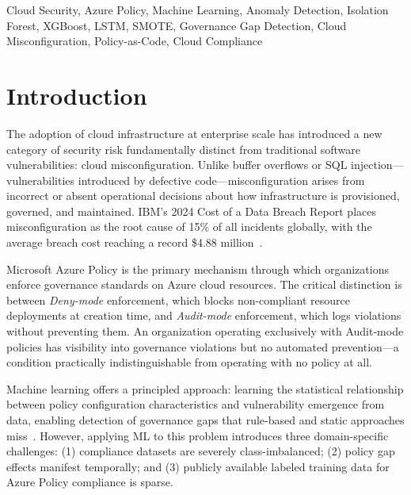 \documentclass[conference]{IEEEtran}
\begin{document}
\begin{IEEEkeywords}
Cloud Security, Azure Policy, Machine Learning, Anomaly Detection, 
Isolation Forest, XGBoost, LSTM, SMOTE, Governance Gap Detection, 
Cloud Misconfiguration, Policy-as-Code, Cloud Compliance
\end{IEEEkeywords}

\section{Introduction}

The adoption of cloud infrastructure at enterprise scale has introduced 
a new category of security risk fundamentally distinct from traditional 
software vulnerabilities: cloud misconfiguration. Unlike buffer 
overflows or SQL injection---vulnerabilities introduced by defective 
code---misconfiguration arises from incorrect or absent operational 
decisions about how infrastructure is provisioned, governed, and 
maintained. IBM's 2024 Cost of a Data Breach Report places 
misconfiguration as the root cause of 15\% of all incidents globally, 
with the average breach cost reaching a record \$4.88 million~\cite{ibm2024}.

Microsoft Azure Policy is the primary mechanism through which 
organizations enforce governance standards on Azure cloud resources. 
The critical distinction is between \emph{Deny-mode} enforcement, which 
blocks non-compliant resource deployments at creation time, and 
\emph{Audit-mode} enforcement, which logs violations without preventing 
them. An organization operating exclusively with Audit-mode policies 
has visibility into governance violations but no automated 
prevention---a condition practically indistinguishable from operating 
with no policy at all.

Machine learning offers a principled approach: learning the statistical 
relationship between policy configuration characteristics and 
vulnerability emergence from data, enabling detection of governance 
gaps that rule-based and static approaches miss~\cite{nassif2021}. 
However, applying ML to this problem introduces three domain-specific 
challenges: (1) compliance datasets are severely class-imbalanced; 
(2) policy gap effects manifest temporally; and (3) publicly available 
labeled training data for Azure Policy compliance is sparse.
\end{document}

